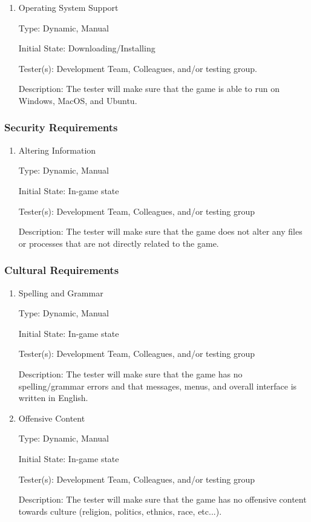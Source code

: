 \documentclass[12pt, titlepage]{article}
\begin{document}
\begin{enumerate}

\item{Operating System Support\\}

Type: Dynamic, Manual

Initial State: Downloading/Installing

Tester(s): Development Team, Colleagues, and/or testing group.

Description: The tester will make sure that the game is able to run on Windows, MacOS, and Ubuntu.

\end{enumerate}

\subsubsection{Security Requirements}

\begin{enumerate}

\item{Altering Information\\}

Type: Dynamic, Manual

Initial State: In-game state

Tester(s): Development Team, Colleagues, and/or testing group

Description: The tester will make sure that the game does not alter any files or processes that are not directly related to the game.

\end{enumerate}


\subsubsection{Cultural Requirements}

\begin{enumerate}

\item{Spelling and Grammar\\}

Type: Dynamic, Manual

Initial State: In-game state

Tester(s): Development Team, Colleagues, and/or testing group

Description: The tester will make sure that the game has no spelling/grammar errors and that messages, menus, and overall interface is written in English.

\item{Offensive Content\\}

Type: Dynamic, Manual

Initial State: In-game state

Tester(s): Development Team, Colleagues, and/or testing group

Description: The tester will make sure that the game has no offensive content towards culture (religion, politics, ethnics, race, etc...).

\end{enumerate}
\end{document}
